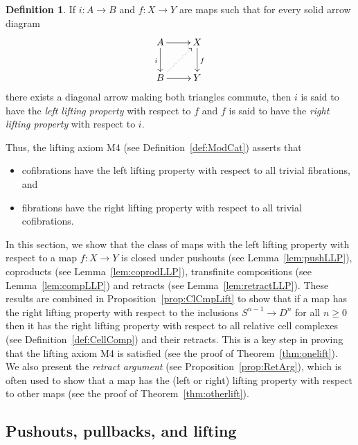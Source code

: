 \documentclass{amsart}
\numberwithin{equation}{section}
\theoremstyle{slplain}
\theoremstyle{definition}
\newtheorem{defn}[equation]{Definition} %
\theoremstyle{remark}
\newcommand{\thmref}{Theorem~\ref}
\newcommand{\propref}{Proposition~\ref}
\newcommand{\lemref}{Lemma~\ref}
\newcommand{\defref}{Definition~\ref}
\begin{document}
\begin{defn}
  \label{def:LLP}
  If $i\colon A \to B$ and $f\colon X \to Y$ are maps such that for
  every solid arrow diagram
  \begin{displaymath}
    \xymatrix{
      {A} \ar[r] \ar[d]_{i}
      & {X} \ar[d]^{f}\\
      {B} \ar[r] \ar@{..>}[ur]
      & {Y}
    }
  \end{displaymath}
  there exists a diagonal arrow making both triangles commute, then
  $i$ is said to have the \emph{left lifting property} with respect to
  $f$ and $f$ is said to have the \emph{right lifting property} with
  respect to $i$.
\end{defn}

Thus, the lifting axiom M4 (see \defref{def:ModCat}) asserts that
\begin{itemize}
\item cofibrations have the left lifting property with respect to all
  trivial fibrations, and
\item fibrations have the right lifting property with respect to all
  trivial cofibrations.
\end{itemize}
In this section, we show that the class of maps with the left lifting
property with respect to a map $f\colon X \to Y$ is closed under
pushouts (see \lemref{lem:pushLLP}), coproducts (see
\lemref{lem:coprodLLP}), transfinite compositions (see
\lemref{lem:compLLP}) and retracts (see \lemref{lem:retractLLP}).
These results are combined in \propref{prop:ClCmpLift} to show that if
a map has the right lifting property with respect to the inclusions
$S^{n-1} \to D^{n}$ for all $n \ge 0$ then it has the right lifting
property with respect to all relative cell complexes (see
\defref{def:CellComp}) and their retracts.  This is a key step in
proving that the lifting axiom M4 is satisfied (see the proof of
\thmref{thm:onelift}).  We also present the \emph{retract argument}
(see \propref{prop:RetArg}), which is often used to show that a map
has the (left or right) lifting property with respect to other maps
(see the proof of \thmref{thm:otherlift}).

\subsection{Pushouts, pullbacks, and lifting}
\label{sec:PushPullLift}
\end{document}
